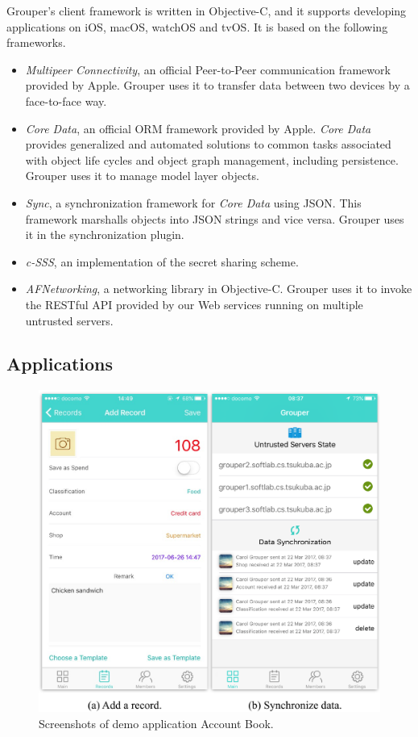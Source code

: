 \documentclass[twocolumn,10pt]{article}
\begin{document}
Grouper's client framework is written in Objective-C, and it supports developing applications on iOS, macOS, watchOS and tvOS.
It is based on the following frameworks.   

\begin{itemize}
	\setlength{\itemsep}{1pt}
	\setlength{\parskip}{0pt}
	\setlength{\parsep}{0pt}
	\item 
	\emph{Multipeer Connectivity}\cite{mc},  an official Peer-to-Peer communication framework provided by Apple. 
	Grouper uses it to transfer data between two devices by a face-to-face way.
	\item 
	\emph{Core Data}\cite{coredata}, an official ORM framework provided by Apple.
	\emph{Core Data} provides generalized and automated solutions to common tasks associated with object life cycles and object graph management, including persistence. 
	Grouper uses it to manage model layer objects. 
	\item 
	\emph{Sync}, a synchronization framework for \emph{Core Data} using JSON. 
	This framework marshalls objects into JSON strings and vice versa. 
	Grouper uses it in the synchronization plugin.
	\item 
	\emph{c-SSS}\cite{c-sss}, an implementation of the secret sharing scheme.
	\item 
	\emph{AFNetworking}\cite{afnetworking}, a networking library in Objective-C. 
	Grouper uses it to invoke the RESTful API provided by our Web services running on multiple untrusted servers. 
\end{itemize}

\subsection{Applications}

\begin{figure}[t]
	\centering
	\includegraphics[scale=0.5]{account_book}
	\caption{Screenshots of demo application Account Book.}
\end{figure}
\end{document}
